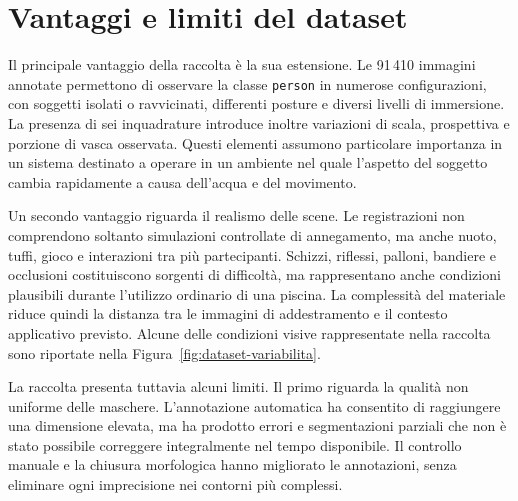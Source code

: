 \section{Vantaggi e limiti del dataset}
\label{sec:dataset-vantaggi-limiti}

Il principale vantaggio della raccolta è la sua estensione. Le 91\,410 immagini annotate permettono di osservare la classe \texttt{person} in numerose configurazioni, con soggetti isolati o ravvicinati, differenti posture e diversi livelli di immersione. La presenza di sei inquadrature introduce inoltre variazioni di scala, prospettiva e porzione di vasca osservata. Questi elementi assumono particolare importanza in un sistema destinato a operare in un ambiente nel quale l'aspetto del soggetto cambia rapidamente a causa dell'acqua e del movimento.

Un secondo vantaggio riguarda il realismo delle scene. Le registrazioni non comprendono soltanto simulazioni controllate di annegamento, ma anche nuoto, tuffi, gioco e interazioni tra più partecipanti. Schizzi, riflessi, palloni, bandiere e occlusioni costituiscono sorgenti di difficoltà, ma rappresentano anche condizioni plausibili durante l'utilizzo ordinario di una piscina. La complessità del materiale riduce quindi la distanza tra le immagini di addestramento e il contesto applicativo previsto. Alcune delle condizioni visive rappresentate nella raccolta sono riportate nella Figura~\ref{fig:dataset-variabilita}.

La raccolta presenta tuttavia alcuni limiti. Il primo riguarda la qualità non uniforme delle maschere. L'annotazione automatica ha consentito di raggiungere una dimensione elevata, ma ha prodotto errori e segmentazioni parziali che non è stato possibile correggere integralmente nel tempo disponibile. Il controllo manuale e la chiusura morfologica hanno migliorato le annotazioni, senza eliminare ogni imprecisione nei contorni più complessi.

